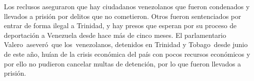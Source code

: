 \documentclass{article}%
\begin{document}
\newline%
%
Los reclusos aseguraron que hay ciudadanos venezolanos que fueron condenados y llevados a prisión por delitos que no cometieron. Otros fueron sentenciados por entrar de forma ilegal a Trinidad, y hay presos que esperan por su proceso de deportación a Venezuela desde hace más de cinco meses.%
\newline%
%
El parlamentario Valero~aseveró~que los~venezolanos, detenidos en Trinidad y Tobago~desde junio de este año, huían de la crisis económica del país con pocos recursos económicos y por ello no pudieron cancelar multas de detención, por lo que fueron llevados a prisión.%
\newline%
%
\end{document}
